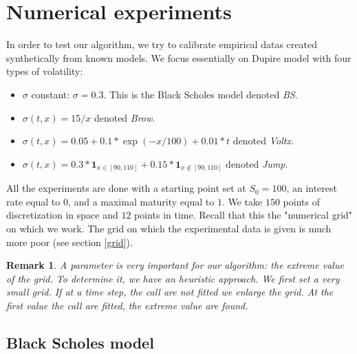 \documentclass[a4paper]{article}
\newtheorem{remark}{Remark}[section]
\begin{document}
\section{Numerical experiments}

In order to test our algorithm, we try to calibrate empirical
datas created synthetically from known models. We focus
essentially on Dupire model with four types of volatility:
\begin{itemize}
\item $\sigma$ constant: $\sigma=0.3$. This is the Black Scholes
model denoted \textit{BS}.
\item $\sigma (t,x) = 15/x$ denoted \textit{Brow}.
\item $\sigma (t,x) = 0.05+0.1*\exp(-x/100)+0.01*t$ denoted
\textit{Voltx}.
\item $\sigma (t,x) =0.3*\mathbf{1}_{x\in [90,110]}+0.15*\mathbf{1}_{x\notin
[90,110]}$ denoted \textit{Jump}.
\end{itemize}

All the experiments are done with a starting point set at
$S_0=100$, an interest rate equal to $0$, and a maximal maturity
equal to $1$. We take $150$ points of discretization in space and
$12$ points in time. Recall that this the "numerical grid" on
which we work. The grid on which the experimental data is given
is much more poor (see section \ref{grid}).

\begin{remark}
A parameter is very important for our algorithm: the extreme
value of the grid. To determine it, we have an heuristic
approach. We first set a very small grid. If at a time step, the
call are not fitted we enlarge the grid. At the first value the
call are fitted, the extreme value are found.
\end{remark}
\subsection{Black Scholes model}
\end{document}
